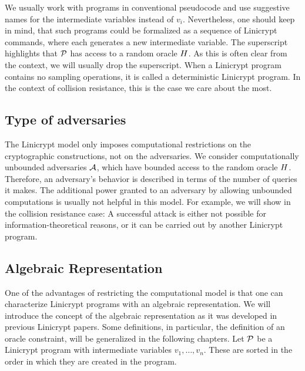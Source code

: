 We usually work with programs in conventional pseudocode and use suggestive names for the intermediate variables instead of $v_i$.
Nevertheless, one should keep in mind,
that such programs could be formalized as a sequence of Linicrypt commands,
where each generates a new intermediate variable.
The superscript highlights that $\P$ has access to a random oracle $\H$.
As this is often clear from the context, we will usually drop the superscript.
When a Linicrypt program contains no sampling operations, it is called a deterministic Linicrypt program. 
In the context of collision resistance, this is the case we care about the most.

\subsection{Type of adversaries}
The Linicrypt model only imposes computational restrictions on the cryptographic constructions,
not on the adversaries.
We consider computationally unbounded adversaries $\A$,
which have bounded access to the random oracle $\H$.
Therefore, an adversary's behavior is described in terms of the number of queries it makes.
The additional power granted to an adversary by allowing unbounded computations is usually not helpful in this model.
For example, we will show in the collision resistance case:
A successful attack is either not possible for information-theoretical reasons,
or it can be carried out by another Linicrypt program.

\subsection{Algebraic Representation}

One of the advantages of restricting the computational model is that one can characterize Linicrypt programs with an algebraic representation.
We will introduce the concept of the algebraic representation as it was developed in previous Linicrypt papers.
Some definitions, in particular, the definition of an oracle constraint, will be generalized in the following chapters.
Let $\P$ be a Linicrypt program with intermediate variables $v_1, \dots, v_n$.
These are sorted in the order in which they are created in the program.

